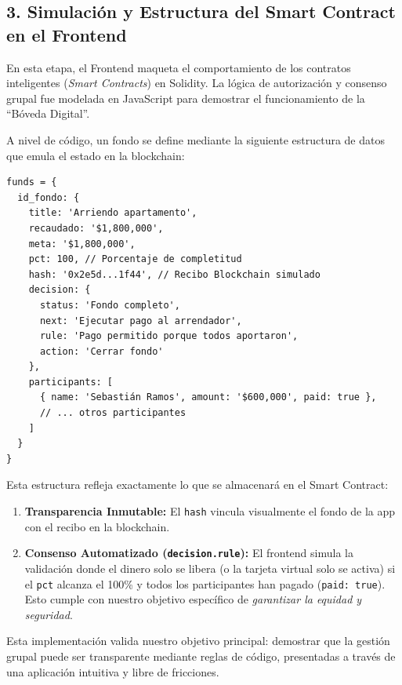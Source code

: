 \documentclass[12pt,a4paper]{article}
\begin{document}
\subsection*{3. Simulación y Estructura del Smart Contract en el Frontend}
En esta etapa, el Frontend maqueta el comportamiento de los contratos inteligentes (\textit{Smart Contracts}) en Solidity. La lógica de autorización y consenso grupal fue modelada en JavaScript para demostrar el funcionamiento de la ``Bóveda Digital''. 

A nivel de código, un fondo se define mediante la siguiente estructura de datos que emula el estado en la blockchain:
\begin{verbatim}
funds = {
  id_fondo: {
    title: 'Arriendo apartamento',
    recaudado: '$1,800,000', 
    meta: '$1,800,000', 
    pct: 100, // Porcentaje de completitud
    hash: '0x2e5d...1f44', // Recibo Blockchain simulado
    decision: { 
      status: 'Fondo completo', 
      next: 'Ejecutar pago al arrendador', 
      rule: 'Pago permitido porque todos aportaron', 
      action: 'Cerrar fondo' 
    },
    participants: [
      { name: 'Sebastián Ramos', amount: '$600,000', paid: true },
      // ... otros participantes
    ]
  }
}
\end{verbatim}
Esta estructura refleja exactamente lo que se almacenará en el Smart Contract:
\begin{enumerate}
    \item \textbf{Transparencia Inmutable:} El \texttt{hash} vincula visualmente el fondo de la app con el recibo en la blockchain.
    \item \textbf{Consenso Automatizado (\texttt{decision.rule}):} El frontend simula la validación donde el dinero solo se libera (o la tarjeta virtual solo se activa) si el \texttt{pct} alcanza el 100\% y todos los participantes han pagado (\texttt{paid: true}). Esto cumple con nuestro objetivo específico de \textit{garantizar la equidad y seguridad}.
\end{enumerate}

Esta implementación valida nuestro objetivo principal: demostrar que la gestión grupal puede ser transparente mediante reglas de código, presentadas a través de una aplicación intuitiva y libre de fricciones.
\end{document}
